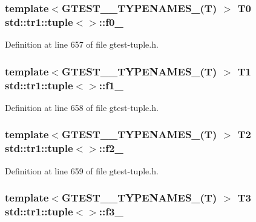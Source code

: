 \subsubsection[{\texorpdfstring{f0\+\_\+}{f0_}}]{\setlength{\rightskip}{0pt plus 5cm}template$<$G\+T\+E\+S\+T\+\_\+\_\+\+T\+Y\+P\+E\+N\+A\+M\+E\+S\+\_\+(\+T) $>$ T0 {\bf std\+::tr1\+::tuple}$<$$>$\+::f0\+\_\+}\hypertarget{classstd_1_1tr1_1_1tuple_a771b1d99e8800fb284acd04bca838cbb}{}\label{classstd_1_1tr1_1_1tuple_a771b1d99e8800fb284acd04bca838cbb}


Definition at line 657 of file gtest-\/tuple.\+h.

\subsubsection[{\texorpdfstring{f1\+\_\+}{f1_}}]{\setlength{\rightskip}{0pt plus 5cm}template$<$G\+T\+E\+S\+T\+\_\+\_\+\+T\+Y\+P\+E\+N\+A\+M\+E\+S\+\_\+(\+T) $>$ T1 {\bf std\+::tr1\+::tuple}$<$$>$\+::f1\+\_\+}\hypertarget{classstd_1_1tr1_1_1tuple_a7cccf899dedc626c51fa4f6921d0ac52}{}\label{classstd_1_1tr1_1_1tuple_a7cccf899dedc626c51fa4f6921d0ac52}


Definition at line 658 of file gtest-\/tuple.\+h.

\subsubsection[{\texorpdfstring{f2\+\_\+}{f2_}}]{\setlength{\rightskip}{0pt plus 5cm}template$<$G\+T\+E\+S\+T\+\_\+\_\+\+T\+Y\+P\+E\+N\+A\+M\+E\+S\+\_\+(\+T) $>$ T2 {\bf std\+::tr1\+::tuple}$<$$>$\+::f2\+\_\+}\hypertarget{classstd_1_1tr1_1_1tuple_aaec06c27366502dc332ef96878628f84}{}\label{classstd_1_1tr1_1_1tuple_aaec06c27366502dc332ef96878628f84}


Definition at line 659 of file gtest-\/tuple.\+h.

\subsubsection[{\texorpdfstring{f3\+\_\+}{f3_}}]{\setlength{\rightskip}{0pt plus 5cm}template$<$G\+T\+E\+S\+T\+\_\+\_\+\+T\+Y\+P\+E\+N\+A\+M\+E\+S\+\_\+(\+T) $>$ T3 {\bf std\+::tr1\+::tuple}$<$$>$\+::f3\+\_\+}\hypertarget{classstd_1_1tr1_1_1tuple_ad4d3673e0d5c07c392c02e335fe978ff}{}\label{classstd_1_1tr1_1_1tuple_ad4d3673e0d5c07c392c02e335fe978ff}


